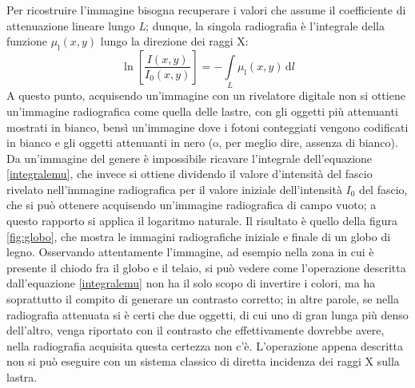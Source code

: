 \documentclass{report}
\newcommand{\figref}[1]{figura \ref{#1}}
\renewcommand{\eqref}[1]{equazione \ref{#1}}
\numberwithin{equation}{section}
\numberwithin{figure}{section}
\begin{document}
\noindent Per ricostruire l'immagine bisogna recuperare i valori che assume il coefficiente di attenuazione lineare lungo \textit{L}; dunque, la singola radiografia è l'integrale della funzione $\mu_\mathrm{l}(x,y)$ lungo la direzione dei raggi X:
\begin{equation}\label{integralemu}
    \boxed{\ln{ \left[ \frac{I(x,y)}{I_0(x,y)} \right]} = -\int\limits_L \mu_\mathrm{l} (x,y)\,\mathrm{d}l}
\end{equation}
A questo punto, acquisendo un'immagine con un rivelatore digitale non si ottiene un'immagine radiografica come quella delle lastre, con gli oggetti più attenuanti mostrati in bianco, bensì un'immagine dove i fotoni conteggiati vengono codificati in bianco e gli oggetti attenuanti in nero (o, per meglio dire, assenza di bianco). Da un'immagine del genere è impossibile ricavare l'integrale dell'\eqref{integralemu}, che invece si ottiene dividendo il valore d'intensità del fascio rivelato nell'immagine radiografica per il valore iniziale dell'intensità $I_0$ del fascio, che si può ottenere acquisendo un'immagine radiografica di campo vuoto; a questo rapporto si applica il logaritmo naturale. Il risultato è quello della \figref{fig:globo}, che mostra le immagini radiografiche iniziale e finale di un globo di legno. Osservando attentamente l'immagine, ad esempio nella zona in cui è presente il chiodo fra il globo e il telaio, si può vedere come l'operazione descritta dall'\eqref{integralemu} non ha il solo scopo di invertire i colori, ma ha soprattutto il compito di generare un contrasto corretto; in altre parole, se nella radiografia attenuata si è certi che due oggetti, di cui uno di gran lunga più denso dell'altro, venga riportato con il contrasto che effettivamente dovrebbe avere, nella radiografia acquisita questa certezza non c'è. L'operazione appena descritta non si può eseguire con un sistema classico di diretta incidenza dei raggi X sulla lastra.
\end{document}
